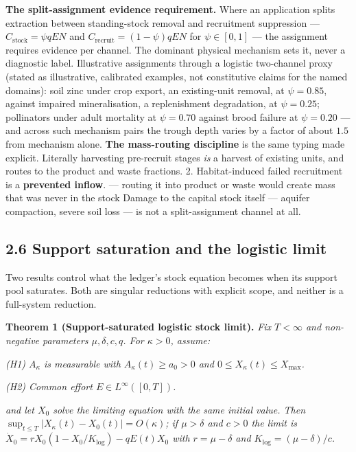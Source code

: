 \documentclass[11pt]{article}
\begin{document}
\textbf{The split-assignment evidence requirement.} Where an application splits extraction between standing-stock removal and recruitment suppression --- \(C_{\mathrm{stock}} = \psi qEN\) and \(C_{\mathrm{recruit}} =\allowbreak{} (1-\psi)qEN\) for \(\psi \in [0,1]\) --- the assignment requires evidence per channel. The dominant physical mechanism sets it, never a diagnostic label. Illustrative assignments through a logistic two-channel proxy (stated as illustrative, calibrated examples, not constitutive claims for the named domains): soil zinc under crop export, an existing-unit removal, at \(\psi = 0.85\), against impaired mineralisation, a replenishment degradation, at \(\psi = 0.25\); pollinators under adult mortality at \(\psi = 0.70\) against brood failure at \(\psi = 0.20\) --- and across such mechanism pairs the trough depth varies by a factor of about \(1.5\) from mechanism alone. \textbf{The mass-routing discipline} is the same typing made explicit. Literally harvesting pre-recruit stages \emph{is} a harvest of existing units, and routes to the product and waste fractions. 2. Habitat-induced failed recruitment is a \textbf{prevented inflow}. — routing it into product or waste would create mass that was never in the stock Damage to the capital stock itself --- aquifer compaction, severe soil loss --- is not a split-assignment channel at all.

\subsection*{2.6 Support saturation and the logistic limit}\label{26-support-saturation-and-the-logistic-limit}

Two results control what the ledger's stock equation becomes when its support pool saturates. Both are singular reductions with explicit scope, and neither is a full-system reduction.

\textbf{Theorem 1 (Support-saturated logistic stock limit).} \emph{Fix \(T < \infty\) and non-negative parameters \(\mu, \delta, c, q\). For \(\kappa > 0\), assume:}

\emph{(H1) \(A_\kappa\) is measurable with \(A_\kappa(t) \ge a_0 > 0\) and \(0 \le X_\kappa(t) \le X_{\max}\).}

\emph{(H2) Common effort \(E \in L^\infty([0,T])\).}

\emph{and let \(X_0\) solve the limiting equation with the same initial value. Then \(\sup_{t \le T} |X_\kappa(t) - X_0(t)| =\allowbreak{} O(\kappa)\); if \(\mu > \delta\) and \(c > 0\) the limit is \(\dot X_0 =\allowbreak{} rX_0(1 - X_0/\allowbreak{}K_{\log}) - qE(t)X_0\) with \(r = \mu - \delta\) and \(K_{\log} = (\mu - \delta)/c\).}
\end{document}

